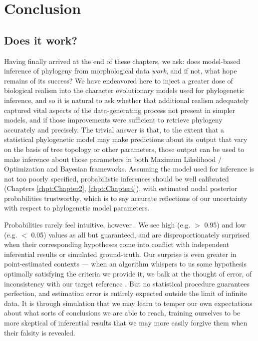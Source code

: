 \chapter{Conclusion}

\label{chpt:Chapter5}


\clearpage


\section{Does it work?}

Having finally arrived at the end of these chapters, we ask: does model-based inference of phylogeny from morphological data \textit{work}, and if not, what hope remains of its success? We have endeavored here to inject a greater dose of biological realism into the character evolutionary models used for phylogenetic inference, and so it is natural to ask whether that additional realism adequately captured vital aspects of the data-generating process not present in simpler models, and if those improvements were sufficient to retrieve phylogeny accurately and precisely. The trivial answer is that, to the extent that a statistical phylogenetic model may make predictions about its output that vary on the basis of tree topology or other parameters, those output can be used to make inference about those parameters in both Maximum Likelihood / Optimization and Bayesian frameworks. Assuming the model used for inference is not too poorly specified, probabilistic inferences should be well calibrated (Chapters \ref{chpt:Chapter2}, \ref{chpt:Chapter4}), with estimated nodal posterior probabilities trustworthy, which is to say accurate reflections of our uncertainty with respect to phylogenetic model parameters.

Probabilities rarely feel intuitive, however \citep{griffithsReconcilingIntuitionProbability2001}. We see high (e.g. $>$ 0.95) and low (e.g. $<$ 0.05) values as all but guaranteed, and are disproportionately surprised when their corresponding hypotheses come into conflict with independent inferential results or simulated ground-truth. Our surprise is even greater in point-estimated contexts --- when an algorithm whispers to us some hypothesis optimally satisfying the criteria we provide it, we balk at the thought of error, of inconsistency with our target reference \citep{collardHowReliableAre2000, gibbsSofttissueCharactersHigher2000}. But no statistical procedure guarantees perfection, and estimation error is entirely expected outside the limit of infinite data. It is through simulation that we may learn to temper our own expectations about what sorts of conclusions we are able to reach, training ourselves to be more skeptical of inferential results that we may more easily forgive them when their falsity is revealed. 

